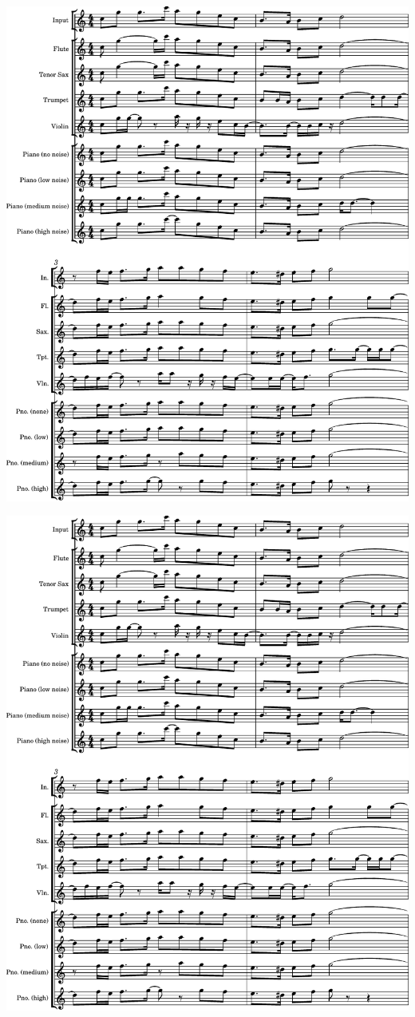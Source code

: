 \includegraphics[page=1, width=\linewidth]{materials/piranha_melody.pdf}
\clearpage

\includegraphics[page=2, width=\linewidth]{materials/piranha_melody.pdf}
\clearpage


